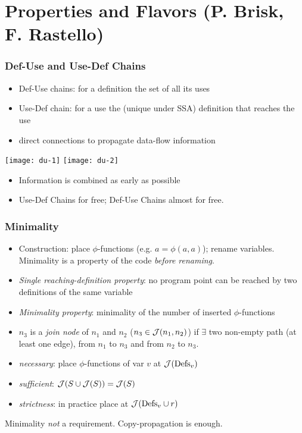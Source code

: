 

\section{Properties and Flavors (P. Brisk, F. Rastello)}
\begin{frame}
\frametitle{Def-Use and Use-Def Chains}
\begin{itemize}
\item Def-Use chains: for a definition the set of all its uses
\item Use-Def chain: for a use the (unique under SSA) definition that reaches the use
\item direct connections to propagate data-flow information
\end{itemize}
\begin{minipage}[t]{0.5\textwidth}
\texttt{[image: du-1]}\hfill
\texttt{[image: du-2]}
\end{minipage}
\begin{minipage}[t]{0.48\textwidth}
\begin{itemize}
\item Information is combined as early as possible
\item Use-Def Chains for free; Def-Use Chains almost for free. 
\end{itemize}
\end{minipage}
\end{frame}

\begin{frame}
\frametitle{Minimality}
\begin{itemize}
\item Construction: place $\phi$-functions (e.g. $a=\phi(a,a)$); rename variables. Minimality is a property of the code \emph{before renaming}.
\item \emph{Single reaching-definition property}: no program point can be reached
by two definitions of the same variable
\item \emph{Minimality property}: minimality of the number of inserted $\phi$-functions
\item $n_3$ is a \emph{join node}  of $n_1$ and $n_2$ ($n_3\in {\cal J}(n_1,n_2)$) if $\exists$ two non-empty path (at least one edge), from $n_1$ to $n_3$ and from $n_2$ to $n_3$. 
\item \emph{necessary}: place $\phi$-functions of var $v$ at ${\cal J}(\textrm{Defs}_v)$
\item \emph{sufficient}: ${\cal J}(S \cup{\cal J}(S))={\cal J}(S)$
\item \emph{strictness}: in practice place at   ${\cal J}(\textrm{Defs}_v\cup r)$ 
\end{itemize}
\begin{minipage}{0.7\textwidth}
\begin{alertblock}{}
Minimality \emph{not} a requirement. Copy-propagation is enough.
\end{alertblock}
\end{minipage}
\end{frame}

